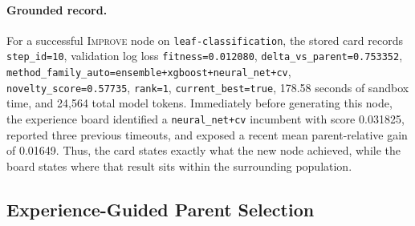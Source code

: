 \paragraph{Grounded record.}
For a successful \textsc{Improve} node on \texttt{leaf-classification}, the stored card records \nolinkurl{step_id=10}, validation log loss \nolinkurl{fitness=0.012080}, \nolinkurl{delta_vs_parent=0.753352}, \nolinkurl{method_family_auto=ensemble+xgboost+neural_net+cv}, \nolinkurl{novelty_score=0.57735}, \nolinkurl{rank=1}, \nolinkurl{current_best=true}, 178.58 seconds of sandbox time, and 24,564 total model tokens. Immediately before generating this node, the experience board identified a \nolinkurl{neural_net+cv} incumbent with score 0.031825, reported three previous timeouts, and exposed a recent mean parent-relative gain of 0.01649. Thus, the card states exactly what the new node achieved, while the board states where that result sits within the surrounding population.

\subsection{Experience-Guided Parent Selection}
\label{app:openmleevo-parent-selection}

